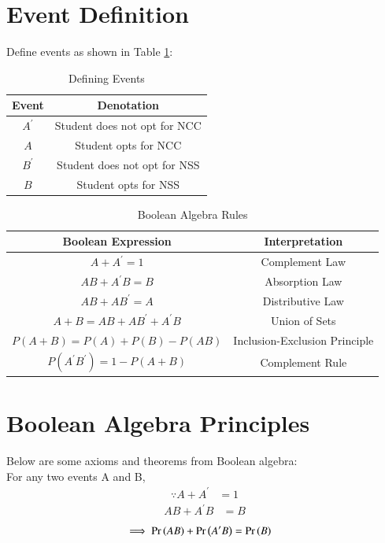 \documentclass[journal]{IEEEtran}
\begin{document}
\section{Event Definition}
Define events as shown in Table \ref{table1}:
\begin{table}[h!]    
  \centering
  \caption{Defining Events}
  \label{table1}
  \begin{tabular}{ |c| c| } 
    \hline
    {Event} & {Denotation}\\ 
    \hline
    $A^\prime $ &  Student does not opt for NCC \\
    \hline 
    $ A $ & Student opts for NCC\\
    \hline
    $ B^\prime $ & Student does not opt for NSS\\
    \hline   
    $ B $ & Student opts for NSS \\
    \hline
  \end{tabular}
\end{table}

\begin{table}[h!]    
  \centering
  \caption{Boolean Algebra Rules}
  \label{table2}
  \begin{tabular}{ |c| c| } 
    \hline
    {Boolean Expression} & {Interpretation}\\ 
    \hline
    $A + A^\prime = 1$ & Complement Law\\
    \hline
    $AB + A^\prime B = B$ & Absorption Law\\
    \hline
    $AB + AB^\prime = A$ & Distributive Law\\
    \hline
    $A + B = AB + AB^\prime + A^\prime B$ & Union of Sets\\
    \hline
    $P(A + B) = P(A) + P(B) - P(AB)$ & Inclusion-Exclusion Principle\\
    \hline
    $P(A^\prime B^\prime) = 1 - P(A + B)$ & Complement Rule\\
    \hline
  \end{tabular}
\end{table}

\section{Boolean Algebra Principles}
Below are some axioms and theorems from Boolean algebra:\\
 For any two events A and B,
\begin{align}
	\because A + A^\prime &= 1 
    \end{align}
    \begin{align}
	 AB + A^\prime B &= B \label{2} 
     \end{align}
    \begin{align}
	 \implies \Pr\left(AB\right) + \Pr\left(A^\prime B\right) &= \Pr\left(B\right) \label{3} 
     \end{align}
\end{document}
